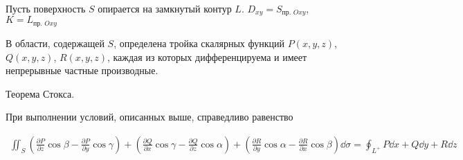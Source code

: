 
\begin{twocolumns}
  
  \columnbreak

  Пусть поверхность \(S\) опирается на замкнутый контур \(L\).
  \(D_{xy} = S_{\text{пр. } Oxy}\), \(K = L_{\text{пр. } Oxy}\)
  
  В области, содержащей \(S\), определена тройка скалярных функций
  \(P(x, y, z)\), \(Q(x, y, z)\), \(R(x, y, z)\), каждая из которых
  дифференцируема и имеет непрерывные частные производные.
\end{twocolumns}
  
\begin{theorem}\label{ST}
  Теорема Стокса.

  При выполнении условий, описанных выше, справедливо равенство
  
  \begin{align*}
    \iint_{S}
      \left(
        \frac{\partial P}{\partial z} \cos \beta
        - \frac{\partial P}{\partial y} \cos \gamma
      \right)
      + \left(
        \frac{\partial Q}{\partial x} \cos \gamma
        - \frac{\partial Q}{\partial z} \cos \alpha
      \right)
      + \left(
        \frac{\partial R}{\partial y} \cos \alpha
        - \frac{\partial R}{\partial x} \cos \beta
      \right) \dd \sigma
    = \oint_{L^{+}} P \dd x + Q \dd y + R \dd z
  \end{align*}
\end{theorem}  
